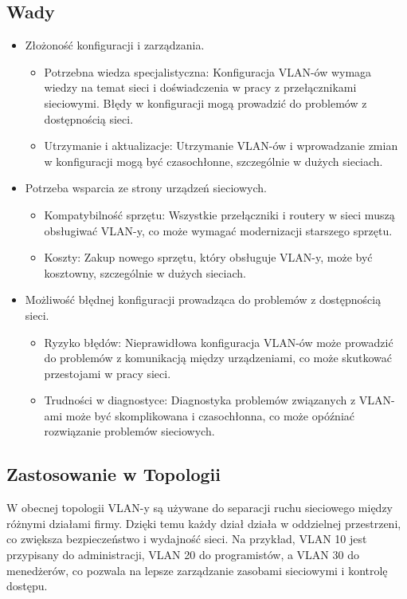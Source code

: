 \subsection{Wady}
\begin{itemize}
    \item Złożoność konfiguracji i zarządzania.
    \begin{itemize}
        \item Potrzebna wiedza specjalistyczna: Konfiguracja VLAN-ów wymaga wiedzy na temat sieci i doświadczenia w pracy z przełącznikami sieciowymi. Błędy w konfiguracji mogą prowadzić do problemów z dostępnością sieci.
        \item Utrzymanie i aktualizacje: Utrzymanie VLAN-ów i wprowadzanie zmian w konfiguracji mogą być czasochłonne, szczególnie w dużych sieciach.
    \end{itemize}
    \item Potrzeba wsparcia ze strony urządzeń sieciowych.
    \begin{itemize}
        \item Kompatybilność sprzętu: Wszystkie przełączniki i routery w sieci muszą obsługiwać VLAN-y, co może wymagać modernizacji starszego sprzętu.
        \item Koszty: Zakup nowego sprzętu, który obsługuje VLAN-y, może być kosztowny, szczególnie w dużych sieciach.
    \end{itemize}
    \item Możliwość błędnej konfiguracji prowadząca do problemów z dostępnością sieci.
    \begin{itemize}
        \item Ryzyko błędów: Nieprawidłowa konfiguracja VLAN-ów może prowadzić do problemów z komunikacją między urządzeniami, co może skutkować przestojami w pracy sieci.
        \item Trudności w diagnostyce: Diagnostyka problemów związanych z VLAN-ami może być skomplikowana i czasochłonna, co może opóźniać rozwiązanie problemów sieciowych.
    \end{itemize}
\end{itemize}

\subsection{Zastosowanie w Topologii}
W obecnej topologii VLAN-y są używane do separacji ruchu sieciowego między różnymi działami firmy. Dzięki temu każdy dział działa w oddzielnej przestrzeni, co zwiększa bezpieczeństwo i wydajność sieci. Na przykład, VLAN 10 jest przypisany do administracji, VLAN 20 do programistów, a VLAN 30 do menedżerów, co pozwala na lepsze zarządzanie zasobami sieciowymi i kontrolę dostępu.

